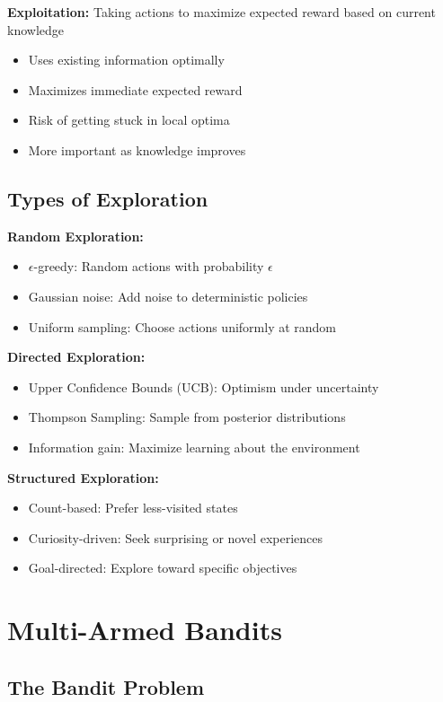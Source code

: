 \textbf{Exploitation:} Taking actions to maximize expected reward based on current knowledge
\begin{itemize}
    \item Uses existing information optimally
    \item Maximizes immediate expected reward
    \item Risk of getting stuck in local optima
    \item More important as knowledge improves
\end{itemize}

\subsection{Types of Exploration}

\textbf{Random Exploration:}
\begin{itemize}
    \item $\epsilon$-greedy: Random actions with probability $\epsilon$
    \item Gaussian noise: Add noise to deterministic policies
    \item Uniform sampling: Choose actions uniformly at random
\end{itemize}

\textbf{Directed Exploration:}
\begin{itemize}
    \item Upper Confidence Bounds (UCB): Optimism under uncertainty
    \item Thompson Sampling: Sample from posterior distributions
    \item Information gain: Maximize learning about the environment
\end{itemize}

\textbf{Structured Exploration:}
\begin{itemize}
    \item Count-based: Prefer less-visited states
    \item Curiosity-driven: Seek surprising or novel experiences
    \item Goal-directed: Explore toward specific objectives
\end{itemize}

\section{Multi-Armed Bandits}

\subsection{The Bandit Problem}


